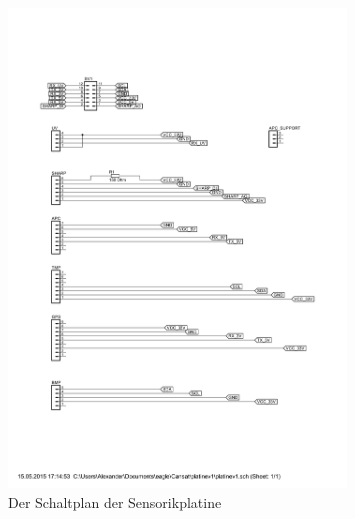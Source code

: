 \begin{figure}[H]
	\centering
	\includegraphics[trim = 60mm 100mm 55mm 100mm, clip, width=0.8\textwidth]{8_Anhang/Schaltplanv1.png}
	\caption{Der Schaltplan der Sensorikplatine}
	\label{pic_schaltplan}
\end{figure}

\newpage

